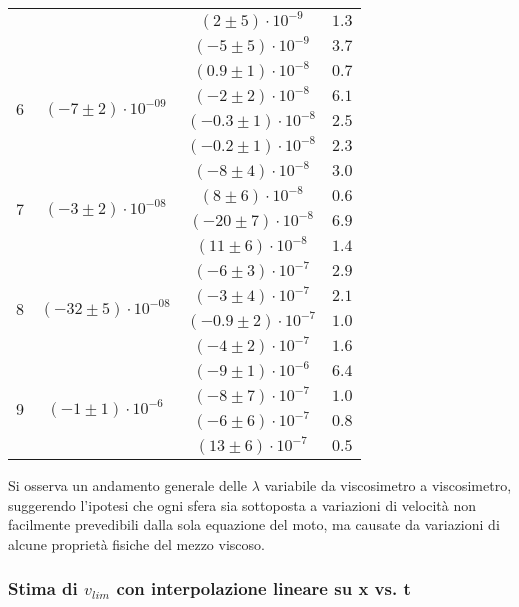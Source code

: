 \documentclass[a4paper,11pt,oneside]{article}
\begin{document}
\begin{table}[h!]
\begin{tabular}{|c|c|c|c|}
        & & $(2 \pm 5)\cdot10^{-9}$ & $1.3$ \\
        & & $(-5 \pm 5)\cdot10^{-9}$ & $3.7$ \\
        \hline
        \multirow{4}{*}{6}& \multirow{4}{*}{$(-7 \pm 2)\cdot10^{-09}$}& $(0.9 \pm 1)\cdot10^{-8}$ & $0.7$ \\
        & & $(-2 \pm 2)\cdot10^{-8}$ & $6.1$ \\
        & & $(-0.3 \pm 1)\cdot10^{-8}$ & $2.5$ \\
        & & $(-0.2 \pm 1)\cdot10^{-8}$ & $2.3$ \\
        \hline
        \multirow{4}{*}{7}& \multirow{4}{*}{$(-3 \pm 2)\cdot10^{-08}$}& $(-8 \pm 4)\cdot10^{-8}$ & $3.0$ \\
        & & $(8 \pm 6)\cdot10^{-8}$ & $0.6$ \\
        & & $(-20 \pm 7)\cdot10^{-8}$ & $6.9$ \\
        & & $(11 \pm 6)\cdot10^{-8}$ & $1.4$ \\
        \hline
        \multirow{4}{*}{8}& \multirow{4}{*}{$(-32 \pm 5)\cdot10^{-08}$}& $(-6 \pm 3)\cdot10^{-7}$ & $2.9$ \\
        & & $(-3 \pm 4)\cdot10^{-7}$ & $2.1$ \\
        & & $(-0.9 \pm 2)\cdot10^{-7}$ & $1.0$ \\
        & & $(-4 \pm 2)\cdot10^{-7}$ & $1.6$ \\
        \hline
        \multirow{4}{*}{9}& \multirow{4}{*}{$(-1 \pm 1)\cdot10^{-6}$}& $(-9 \pm 1)\cdot10^{-6}$ & $6.4$ \\
        & & $(-8 \pm 7)\cdot10^{-7}$ & $1.0$ \\
        & & $(-6 \pm 6)\cdot10^{-7}$ & $0.8$ \\
        & & $(13 \pm 6)\cdot10^{-7}$ & $0.5$ \\
        \hline
    \end{tabular}
\end{table}

Si osserva un andamento generale delle $\lambda$ variabile da viscosimetro a viscosimetro, suggerendo l'ipotesi che ogni sfera sia sottoposta a variazioni di velocità non facilmente prevedibili dalla sola equazione del moto, ma causate da variazioni di alcune proprietà fisiche del mezzo viscoso.

\subsubsection*{Stima di $v_{lim}$ con interpolazione lineare su x vs. t }
\end{document}
